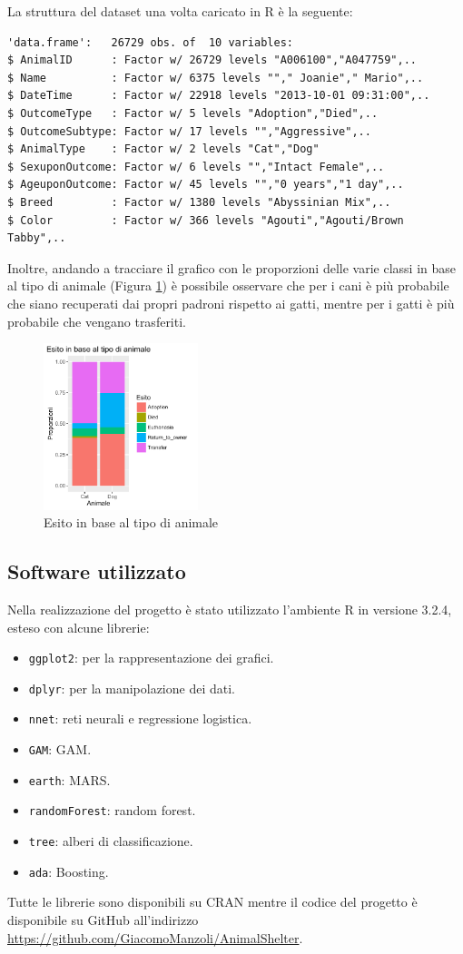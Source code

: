 La struttura del dataset una volta caricato in R è la seguente:

\begin{verbatim}
'data.frame':	26729 obs. of  10 variables:
$ AnimalID      : Factor w/ 26729 levels "A006100","A047759",..
$ Name          : Factor w/ 6375 levels ""," Joanie"," Mario",..
$ DateTime      : Factor w/ 22918 levels "2013-10-01 09:31:00",..
$ OutcomeType   : Factor w/ 5 levels "Adoption","Died",..
$ OutcomeSubtype: Factor w/ 17 levels "","Aggressive",..
$ AnimalType    : Factor w/ 2 levels "Cat","Dog"
$ SexuponOutcome: Factor w/ 6 levels "","Intact Female",..
$ AgeuponOutcome: Factor w/ 45 levels "","0 years","1 day",..
$ Breed         : Factor w/ 1380 levels "Abyssinian Mix",..
$ Color         : Factor w/ 366 levels "Agouti","Agouti/Brown Tabby",..
\end{verbatim}

Inoltre, andando a tracciare il grafico con le proporzioni delle varie classi in base al tipo di animale (Figura \ref{fig-animals}) è possibile osservare che per i cani è più probabile che siano recuperati dai propri padroni rispetto ai gatti, mentre per i gatti è più probabile che vengano trasferiti.

\begin{figure}[htbp]
	\centering
	\includegraphics[width=0.4\textwidth]{./grafici/esito_animal.pdf}
	\caption{Esito in base al tipo di animale}\label{fig-animals}
\end{figure}

\subsection{Software utilizzato}

Nella realizzazione del progetto è stato utilizzato l'ambiente R in versione 3.2.4, esteso con alcune librerie:

\begin{itemize}
	\item \texttt{ggplot2}: per la rappresentazione dei grafici.
	\item \texttt{dplyr}: per la manipolazione dei dati.
	\item \texttt{nnet}: reti neurali e regressione logistica.
	\item \texttt{GAM}: GAM.
	\item \texttt{earth}: MARS.
	\item \texttt{randomForest}: random forest.
	\item \texttt{tree}: alberi di classificazione.
	\item \texttt{ada}: Boosting.
\end{itemize}

Tutte le librerie sono disponibili su CRAN mentre il codice del progetto è disponibile su GitHub all'indirizzo \url{https://github.com/GiacomoManzoli/AnimalShelter}.